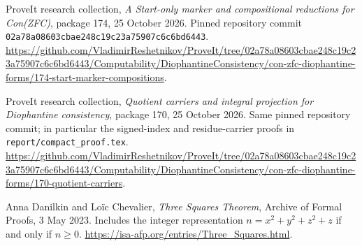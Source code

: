 ProveIt research collection, \emph{A Start-only marker and compositional
reductions for Con(ZFC)}, package 174, 25 October 2026. Pinned repository
commit \texttt{02a78a08603cbae248c19c23a75907c6c6bd6443}.
\url{https://github.com/VladimirReshetnikov/ProveIt/tree/02a78a08603cbae248c19c23a75907c6c6bd6443/Computability/DiophantineConsistency/con-zfc-diophantine-forms/174-start-marker-compositions}.

ProveIt research collection, \emph{Quotient carriers and integral projection
for Diophantine consistency}, package 170, 25 October 2026. Same pinned
repository commit; in particular the signed-index and residue-carrier proofs
in \texttt{report/compact\_proof.tex}.
\url{https://github.com/VladimirReshetnikov/ProveIt/tree/02a78a08603cbae248c19c23a75907c6c6bd6443/Computability/DiophantineConsistency/con-zfc-diophantine-forms/170-quotient-carriers}.

Anna Danilkin and Lo\"ic Chevalier, \emph{Three Squares Theorem}, Archive
of Formal Proofs, 3 May 2023. Includes the integer representation
$n=x^2+y^2+z^2+z$ if and only if $n\ge0$.
\url{https://isa-afp.org/entries/Three_Squares.html}.
